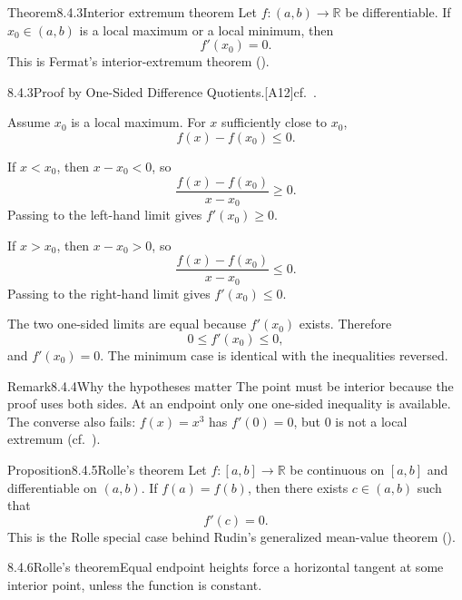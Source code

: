 \documentclass[main.tex]{subfiles}
\begin{document}
\begin{Obj}{Theorem}{8.4.3}{Interior extremum theorem}
Let $f:(a,b)\to\mathbb R$ be differentiable. If $x_0\in(a,b)$ is a local maximum or a
local minimum, then
\[
  f'(x_0)=0.
\]
This is Fermat's interior-extremum theorem ().
\end{Obj}

\begin{Prf}{8.4.3}{Proof by One-Sided Difference Quotients.}{[A12]\quad cf.\ .}
\item Assume $x_0$ is a local maximum. For $x$ sufficiently close to $x_0$,
  \[
    f(x)-f(x_0)\le0 .
  \]
\item If $x<x_0$, then $x-x_0<0$, so
  \[
    \frac{f(x)-f(x_0)}{x-x_0}\ge0.
  \]
  Passing to the left-hand limit gives $f'(x_0)\ge0$.
\item If $x>x_0$, then $x-x_0>0$, so
  \[
    \frac{f(x)-f(x_0)}{x-x_0}\le0.
  \]
  Passing to the right-hand limit gives $f'(x_0)\le0$.
\item The two one-sided limits are equal because $f'(x_0)$ exists. Therefore
  \[
    0\le f'(x_0)\le0,
  \]
  and $f'(x_0)=0$. The minimum case is identical with the inequalities reversed.
\end{Prf}

\begin{ObjL}{Remark}{8.4.4}{Why the hypotheses matter}
The point must be interior because the proof uses both sides. At an endpoint only one one-sided
inequality is available. The converse also fails: $f(x)=x^3$ has $f'(0)=0$, but $0$ is not a
local extremum (cf.\ ).
\end{ObjL}

\begin{Obj}{Proposition}{8.4.5}{Rolle's theorem}
Let $f:[a,b]\to\mathbb R$ be continuous on $[a,b]$ and differentiable on $(a,b)$. If
$f(a)=f(b)$, then there exists $c\in(a,b)$ such that
\[
  f'(c)=0 .
\]
This is the Rolle special case behind Rudin's generalized mean-value theorem ().
\end{Obj}

\begin{Fig}{8.4.6}{Rolle's theorem}{Equal endpoint heights force a horizontal tangent at
some interior point, unless the function is constant.}
\end{Fig}
\end{document}
